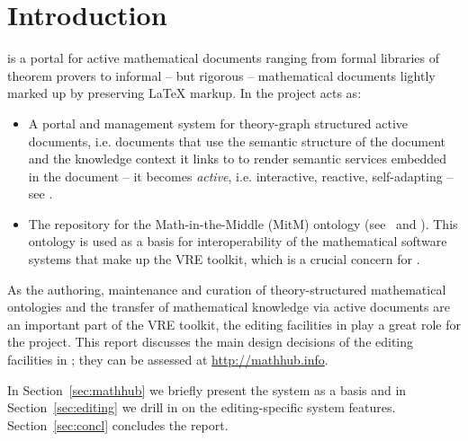 \section{Introduction}\label{sec:intro}

\sys is a portal for active mathematical documents ranging from formal libraries of
theorem provers to informal -- but rigorous -- mathematical documents lightly marked up by
preserving {\LaTeX} markup. In the \pn project \sys acts as: 
\begin{itemize}
\item A portal and management system for theory-graph structured active documents,
  i.e. documents that use the semantic structure of the document and the knowledge context
  it links to to render semantic services embedded in the document -- it becomes
  \emph{active}, i.e. interactive, reactive, self-adapting --
  see .
\item The repository for the Math-in-the-Middle (MitM) ontology
  (see~\cite{DehKohKon:iop16} and ). This ontology is used as a basis for
  interoperability of the mathematical software systems that make up the \pn VRE toolkit,
  which is a crucial concern for .
\end{itemize}
As the authoring, maintenance and curation of theory-structured mathematical ontologies
and the transfer of mathematical knowledge via active documents are an important part of
the \pn VRE toolkit, the editing facilities in \sys play a great role for the
project. This report discusses the main design decisions of the editing facilities in
\sys; they can be assessed at \url{http://mathhub.info}.

In Section~\ref{sec:mathhub} we briefly present the \sys system as a basis and in
Section~\ref{sec:editing} we drill in on the editing-specific system
features. Section~\ref{sec:concl} concludes the report. 


